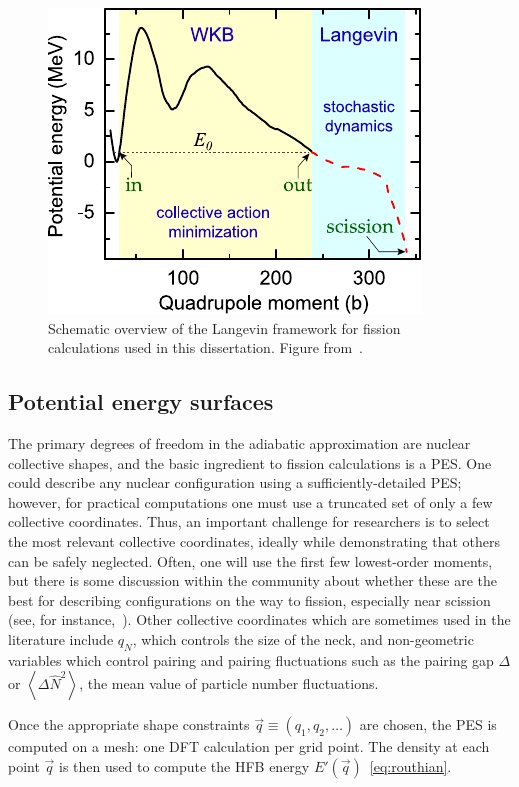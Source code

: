 \begin{figure}
	\centering
	\includegraphics[width=0.5\linewidth]{TeX_files/methods_overview}
	\caption[Schematic overview of the Langevin framework for fission calculations used in this dissertation]{Schematic overview of the Langevin framework for fission calculations used in this dissertation. Figure from~\cite{Sadhukhan2016}.}
	\label{fig:methodsoverview}
\end{figure}

\subsection{Potential energy surfaces}
The primary degrees of freedom in the adiabatic approximation are nuclear collective shapes, and the basic ingredient to fission calculations is a PES. One could describe any nuclear configuration using a sufficiently-detailed PES; however, for practical computations one must use a truncated set of only a few collective coordinates. Thus, an important challenge for researchers is to select the most relevant collective coordinates, ideally while demonstrating that others can be safely neglected. Often, one will use the first few lowest-order moments, but there is some discussion within the community about whether these are the best for describing configurations on the way to fission, especially near scission (see, for instance,~\cite{younes2012}). Other collective coordinates which are sometimes used in the literature include $q_N$, which controls the size of the neck, and non-geometric variables which control pairing and pairing fluctuations such as the pairing gap $\Delta$ or $\left\langle \Delta \hat{N}^2 \right\rangle$, the mean value of particle number fluctuations.

Once the appropriate shape constraints $\vec{q}\equiv(q_1, q_2, \dots)$ are chosen, the PES is computed on a mesh: one DFT calculation per grid point. The density at each point $\vec{q}$ is then used to compute the HFB energy $E'(\vec{q})$~\eqref{eq:routhian}.

